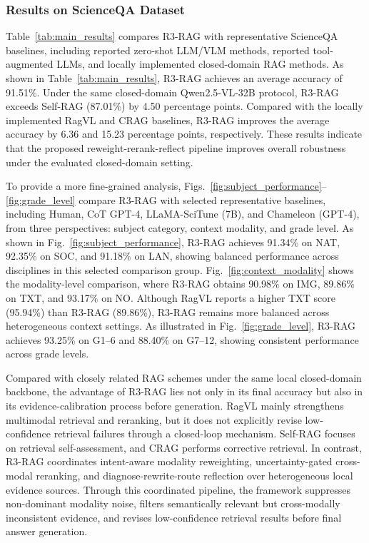 \documentclass[a4paper, fleqn]{cas-dc}
\begin{document}
\subsubsection{Results on ScienceQA Dataset}\label{sec:scienceqa_results}
Table~\ref{tab:main_results} compares R3-RAG with representative ScienceQA baselines, including reported zero-shot LLM/VLM methods, reported tool-augmented LLMs, and locally implemented closed-domain RAG methods. As shown in Table~\ref{tab:main_results}, R3-RAG achieves an average accuracy of 91.51\%. Under the same closed-domain Qwen2.5-VL-32B protocol, R3-RAG exceeds Self-RAG (87.01\%) by 4.50 percentage points. Compared with the locally implemented RagVL and CRAG baselines, R3-RAG improves the average accuracy by 6.36 and 15.23 percentage points, respectively. These results indicate that the proposed reweight-rerank-reflect pipeline improves overall robustness under the evaluated closed-domain setting.

To provide a more fine-grained analysis, Figs.~\ref{fig:subject_performance}--\ref{fig:grade_level} compare R3-RAG with selected representative baselines, including Human, CoT GPT-4, LLaMA-SciTune (7B), and Chameleon (GPT-4), from three perspectives: subject category, context modality, and grade level. As shown in Fig.~\ref{fig:subject_performance}, R3-RAG achieves 91.34\% on NAT, 92.35\% on SOC, and 91.18\% on LAN, showing balanced performance across disciplines in this selected comparison group. Fig.~\ref{fig:context_modality} shows the modality-level comparison, where R3-RAG obtains 90.98\% on IMG, 89.86\% on TXT, and 93.17\% on NO. Although RagVL reports a higher TXT score (95.94\%) than R3-RAG (89.86\%), R3-RAG remains more balanced across heterogeneous context settings. As illustrated in Fig.~\ref{fig:grade_level}, R3-RAG achieves 93.25\% on G1--6 and 88.40\% on G7--12, showing consistent performance across grade levels.

Compared with closely related RAG schemes under the same local closed-domain backbone, the advantage of R3-RAG lies not only in its final accuracy but also in its evidence-calibration process before generation. RagVL mainly strengthens multimodal retrieval and reranking, but it does not explicitly revise low-confidence retrieval failures through a closed-loop mechanism. Self-RAG focuses on retrieval self-assessment, and CRAG performs corrective retrieval. In contrast, R3-RAG coordinates intent-aware modality reweighting, uncertainty-gated cross-modal reranking, and diagnose-rewrite-route reflection over heterogeneous local evidence sources. Through this coordinated pipeline, the framework suppresses non-dominant modality noise, filters semantically relevant but cross-modally inconsistent evidence, and revises low-confidence retrieval results before final answer generation.
\end{document}

